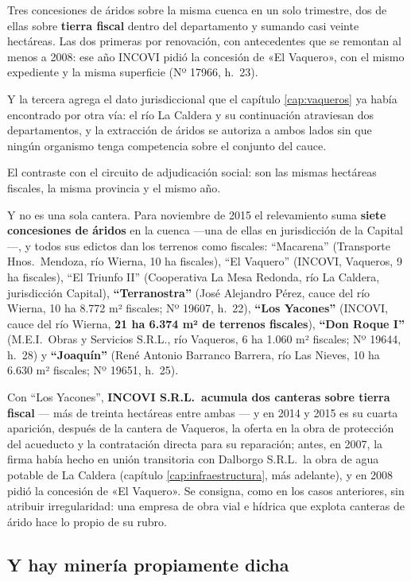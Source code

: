 Tres concesiones de áridos sobre la misma cuenca en un solo trimestre, dos de ellas sobre \textbf{tierra fiscal} dentro del departamento y sumando casi veinte hectáreas. Las dos primeras por renovación, con antecedentes que se remontan al menos a 2008: ese año INCOVI pidió la concesión de «El Vaquero», con el mismo expediente y la misma superficie (Nº 17966, h.\ 23).

Y la tercera agrega el dato jurisdiccional que el capítulo \ref{cap:vaqueros} ya había encontrado por otra vía: el río La Caldera y su continuación atraviesan dos departamentos, y la extracción de áridos se autoriza a ambos lados sin que ningún organismo tenga competencia sobre el conjunto del cauce.

El contraste con el circuito de adjudicación social: son las mismas hectáreas fiscales, la misma provincia y el mismo año.

Y no es una sola cantera. Para noviembre de 2015 el relevamiento suma \textbf{siete concesiones de áridos} en la cuenca ---una de ellas en jurisdicción de la Capital---, y todos sus edictos dan los terrenos como fiscales: ``Macarena'' (Transporte Hnos.\ Mendoza, río Wierna, 10 ha fiscales), ``El Vaquero'' (INCOVI, Vaqueros, 9 ha fiscales), ``El Triunfo II'' (Cooperativa La Mesa Redonda, río La Caldera, jurisdicción Capital), \textbf{``Terranostra''} (José Alejandro Pérez, cauce del río Wierna, 10 ha 8.772 m² fiscales; Nº 19607, h.\ 22), \textbf{``Los Yacones''} (INCOVI, cauce del río Wierna, \textbf{21 ha 6.374 m² de terrenos fiscales}), \textbf{``Don Roque I''} (M.E.I.\ Obras y Servicios S.R.L., río Vaqueros, 6 ha 1.060 m² fiscales; Nº 19644, h.\ 28) y \textbf{``Joaquín''} (René Antonio Barranco Barrera, río Las Nieves, 10 ha 6.630 m² fiscales; Nº 19651, h.\ 25).

Con ``Los Yacones'', \textbf{INCOVI S.R.L.\ acumula dos canteras sobre tierra fiscal} --- más de treinta hectáreas entre ambas --- y en 2014 y 2015 es su cuarta aparición, después de la cantera de Vaqueros, la oferta en la obra de protección del acueducto y la contratación directa para su reparación; antes, en 2007, la firma había hecho en unión transitoria con Dalborgo S.R.L.\ la obra de agua potable de La Caldera (capítulo \ref{cap:infraestructura}, más adelante), y en 2008 pidió la concesión de «El Vaquero». Se consigna, como en los casos anteriores, sin atribuir irregularidad: una empresa de obra vial e hídrica que explota canteras de árido hace lo propio de su rubro.

\subsection*{Y hay minería propiamente dicha}

